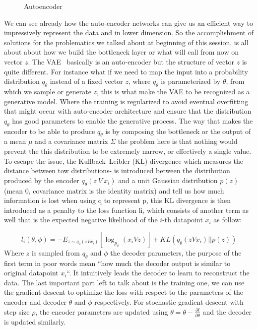 \begin{figure}
	\centerline
	\autoencoder
	\caption{Autoencoder}
	\label{fig:autoencoder}
\end{figure} 

We can see already how the auto-encoder networks can give us an efficient way to  impressively represent the data and in lower dimension. So the accomplishment of solutions for the problematics we talked about at beginning of this session, is all about about how we build the bottleneck layer or what will call from now on vector $z$. The VAE~\cite{kingma2013auto} basically is an auto-encoder but the structure of vector $z$ is quite different. For instance what if we need to map the input into a probability distribution $q_{\theta}$ instead of a fixed vector $z$, where $q_{\theta}$ is parameterized by $\theta$, from which we sample or generate $z$, this is what make the VAE to be recognized as a generative model. Where the training is regularized to avoid eventual overfitting  that might occur with auto-encoder architecture and ensure that the distribution $q_{\theta}$ has good parameters to enable the generative process. The way that makes the encoder to be able to produce $q_\theta$ is by composing the bottleneck or the output of a mean $\mu$ and a covariance matrix $\Sigma$ the problem here is that nothing would prevent the this distribution to be extremely narrow, or effectively a single value. To escape the issue, the Kullback–Leibler (KL) divergence-which measures the distance between tow distributions- is introduced  between the distribution produced by the encoder $q_{\theta}(z \ V \ x_i)$ and a unit Gaussian distribution $p(z)$(mean $0$, covariance matrix is the identity matrix) and tell us how much information is lost when using q to represent p, this KL divergence is then introduced as a penalty to the loss function li, which consists of another term as well that is the expected negative likelihood of the $i$-th datapoint $x_i$ as follow:


\begin{equation}
l_i(\theta,\phi)=-E_{z\sim q_\theta (zVx_i)}[\log_{p_\phi}(x_i V z)]+KL(q_\theta (zVx_i)||p(z))
\label{eq:VAE_loss}
\end{equation}
Where $z$ is sampled from $q_\theta$ and $\phi$ the decoder parameters, the purpose of the first term in poor words mean “how much the decoder output is similar to original datapoint $x_i$“. It intuitively leads the decoder to learn to reconstruct the data. The last important part left to talk about is the training one, we can use the gradient descent to optimize the loss with respect to the parameters of the encoder and decoder $\theta$ and $\phi$ respectively. For stochastic gradient descent with step size $\rho$, the encoder parameters are updated using $\theta=\theta-\frac{\partial l}{\partial \theta} $  and the decoder is updated similarly.



